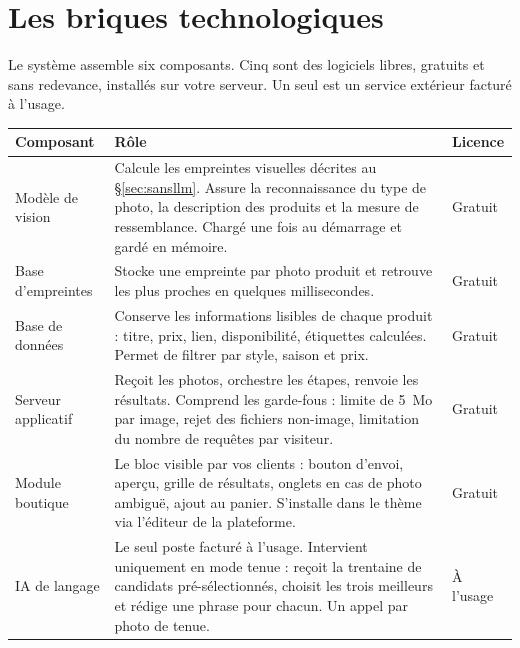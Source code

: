 \documentclass[11pt,a4paper]{article}
\begin{document}
\newpage
\section{Les briques technologiques}

Le système assemble six composants. Cinq sont des logiciels libres, gratuits et
sans redevance, installés sur votre serveur. Un seul est un service extérieur
facturé à l'usage.

\vspace{0.6em}
\begin{tabularx}{\textwidth}{L{2.9cm} X L{2.6cm}}
\toprule
\textbf{Composant} & \textbf{Rôle} & \textbf{Licence} \\
\midrule

Modèle de vision &
Calcule les empreintes visuelles décrites au §\ref{sec:sansllm}. Assure la
reconnaissance du type de photo, la description des produits et la mesure de
ressemblance. Chargé une fois au démarrage et gardé en mémoire. &
Gratuit \\

Base d'empreintes &
Stocke une empreinte par photo produit et retrouve les plus proches en quelques
millisecondes. &
Gratuit \\

Base de données &
Conserve les informations lisibles de chaque produit : titre, prix, lien,
disponibilité, étiquettes calculées. Permet de filtrer par style, saison et
prix. &
Gratuit \\

Serveur applicatif &
Reçoit les photos, orchestre les étapes, renvoie les résultats. Comprend les
garde-fous : limite de 5~Mo par image, rejet des fichiers non-image, limitation
du nombre de requêtes par visiteur. &
Gratuit \\

Module boutique &
Le bloc visible par vos clients : bouton d'envoi, aperçu, grille de résultats,
onglets en cas de photo ambiguë, ajout au panier. S'installe dans le thème via
l'éditeur de la plateforme. &
Gratuit \\

\midrule
IA de langage &
Le seul poste facturé à l'usage. Intervient uniquement en mode tenue : reçoit la
trentaine de candidats pré-sélectionnés, choisit les trois meilleurs et rédige
une phrase pour chacun. Un appel par photo de tenue. &
À l'usage \\
\bottomrule
\end{tabularx}
\end{document}
